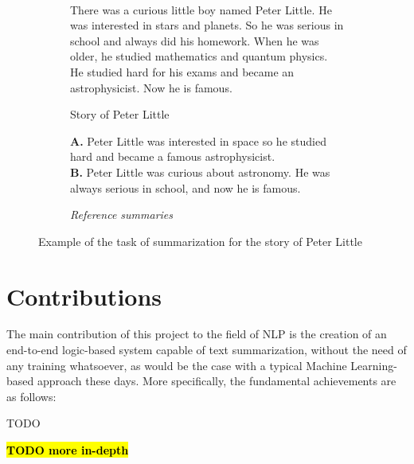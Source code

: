 \begin{figure}[H]\
\begin{subfigure}{\textwidth}
\begin{displayquote}
There was a curious little boy named Peter Little. He was interested in stars and planets. So he was serious in school and always did his homework. When he was older, he studied mathematics and quantum physics. He studied hard for his exams and became an astrophysicist. Now he is famous.
\end{displayquote}
\caption{Story of Peter Little}
\vspace{\baselineskip}
\end{subfigure}
\begin{subfigure}{\textwidth}
\begin{displayquote}
\textbf{A.} Peter Little was interested in space so he studied hard and became a famous astrophysicist.\\
\textbf{B.} Peter Little was curious about astronomy. He was always serious in school, and now he is famous.
\caption{\textit{Reference summaries}}
\end{displayquote}
\end{subfigure}
\caption{Example of the task of summarization for the story of Peter Little}
\label{fig:peter_little}
\end{figure}

\section{Contributions}

The main contribution of this project to the field of NLP is the creation of an end-to-end logic-based system capable of text summarization, without the need of any training whatsoever, as would be the case with a typical Machine Learning-based approach these days. More specifically, the fundamental achievements are as follows:

\begin{contribution}
TODO
\end{contribution}

\textcolor{red}{\textbf{\hl{TODO more in-depth}}}